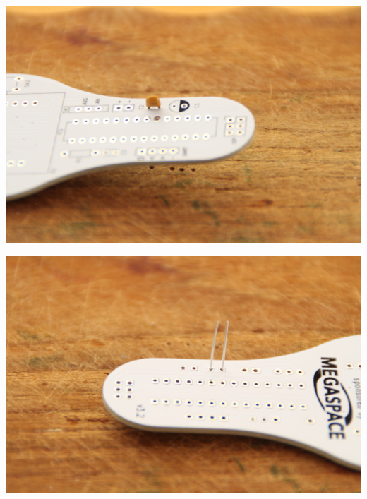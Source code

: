 \documentclass{article}
\begin{document}
\vspace{0.5cm}

\begin{minipage}[b]{0.5\textwidth}
	\includegraphics[width=\textwidth]{Bilder2023/IMG_8338.JPG}
\end{minipage}
\begin{minipage}[b]{0.5\textwidth}
	\includegraphics[width=\textwidth]{Bilder2023/IMG_8339.JPG}
\end{minipage}

\vspace{0.5cm}
\end{document}
